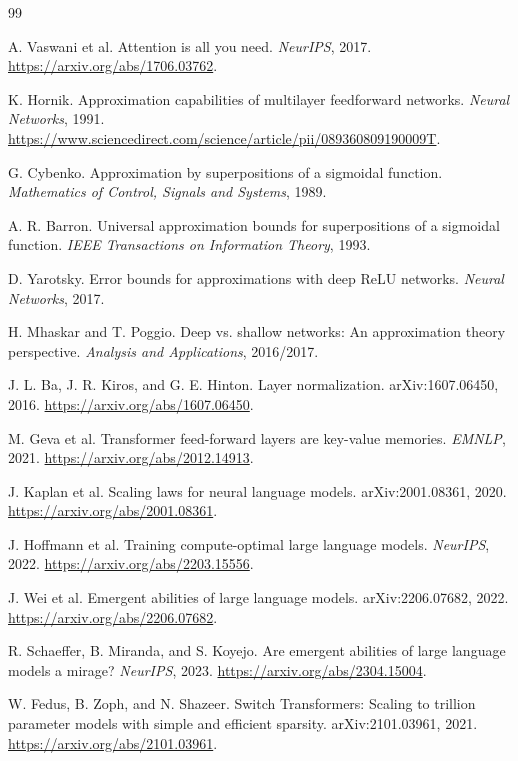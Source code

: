 \documentclass[11pt]{article}
\theoremstyle{definition}
\begin{document}
\begin{thebibliography}{99}

A. Vaswani et al. Attention is all you need. \emph{NeurIPS}, 2017. \url{https://arxiv.org/abs/1706.03762}.

K. Hornik. Approximation capabilities of multilayer feedforward networks. \emph{Neural Networks}, 1991. \url{https://www.sciencedirect.com/science/article/pii/089360809190009T}.

G. Cybenko. Approximation by superpositions of a sigmoidal function. \emph{Mathematics of Control, Signals and Systems}, 1989.

A. R. Barron. Universal approximation bounds for superpositions of a sigmoidal function. \emph{IEEE Transactions on Information Theory}, 1993.

D. Yarotsky. Error bounds for approximations with deep ReLU networks. \emph{Neural Networks}, 2017.

H. Mhaskar and T. Poggio. Deep vs. shallow networks: An approximation theory perspective. \emph{Analysis and Applications}, 2016/2017.

J. L. Ba, J. R. Kiros, and G. E. Hinton. Layer normalization. arXiv:1607.06450, 2016. \url{https://arxiv.org/abs/1607.06450}.

M. Geva et al. Transformer feed-forward layers are key-value memories. \emph{EMNLP}, 2021. \url{https://arxiv.org/abs/2012.14913}.

J. Kaplan et al. Scaling laws for neural language models. arXiv:2001.08361, 2020. \url{https://arxiv.org/abs/2001.08361}.

J. Hoffmann et al. Training compute-optimal large language models. \emph{NeurIPS}, 2022. \url{https://arxiv.org/abs/2203.15556}.

J. Wei et al. Emergent abilities of large language models. arXiv:2206.07682, 2022. \url{https://arxiv.org/abs/2206.07682}.

R. Schaeffer, B. Miranda, and S. Koyejo. Are emergent abilities of large language models a mirage? \emph{NeurIPS}, 2023. \url{https://arxiv.org/abs/2304.15004}.

W. Fedus, B. Zoph, and N. Shazeer. Switch Transformers: Scaling to trillion parameter models with simple and efficient sparsity. arXiv:2101.03961, 2021. \url{https://arxiv.org/abs/2101.03961}.


\end{thebibliography}
\end{document}
